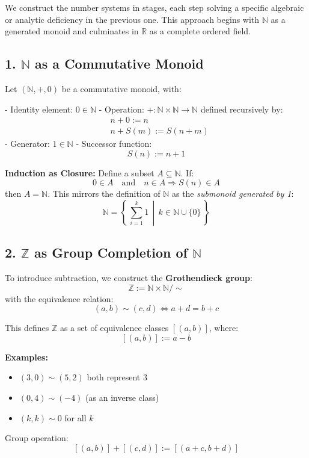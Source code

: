 \documentclass[10pt]{article}
\begin{document}
We construct the number systems in stages, each step solving a specific algebraic or analytic deficiency in the previous one. This approach begins with $\mathbb{N}$ as a generated monoid and culminates in $\mathbb{R}$ as a complete ordered field.

\subsection*{1. $\mathbb{N}$ as a Commutative Monoid}

Let $(\mathbb{N}, +, 0)$ be a commutative monoid, with:

- Identity element: $0 \in \mathbb{N}$
- Operation: $+: \mathbb{N} \times \mathbb{N} \to \mathbb{N}$ defined recursively by:
$$
\begin{aligned}
	& n + 0 := n \\
	& n + S(m) := S(n + m)
\end{aligned}
$$
- Generator: $1 \in \mathbb{N}$
- Successor function: 
$$
S(n) := n + 1
$$

\textbf{Induction as Closure:} Define a subset $A \subseteq \mathbb{N}$. If:
$$
0 \in A \quad \text{and} \quad n \in A \Rightarrow S(n) \in A
$$
then $A = \mathbb{N}$. This mirrors the definition of $\mathbb{N}$ as the \emph{submonoid generated by 1}:
$$
\mathbb{N} = \left\{\, \sum_{i=1}^{k} 1 \,\middle|\, k \in \mathbb{N} \cup \{0\} \,\right\}
$$

\subsection*{2. $\mathbb{Z}$ as Group Completion of $\mathbb{N}$}

To introduce subtraction, we construct the \textbf{Grothendieck group}:
$$
\mathbb{Z} := \mathbb{N} \times \mathbb{N} \big/ \sim
$$
with the equivalence relation:
$$
(a, b) \sim (c, d) \iff a + d = b + c
$$

This defines $\mathbb{Z}$ as a set of equivalence classes $[(a, b)]$, where:
$$
[(a, b)] := a - b
$$

\textbf{Examples:}
\begin{itemize}
	\item $(3, 0) \sim (5, 2)$ both represent $3$
	\item $(0, 4) \sim (-4)$ (as an inverse class)
	\item $(k, k) \sim 0$ for all $k$
\end{itemize}

Group operation:
$$
[(a, b)] + [(c, d)] := [(a + c, b + d)]
$$
\end{document}
